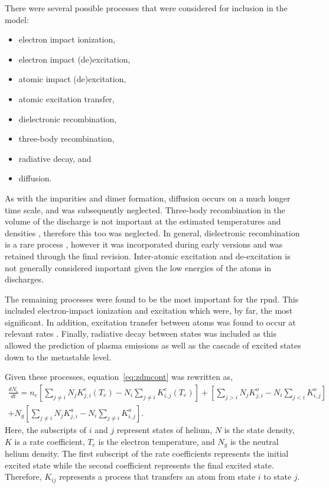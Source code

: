 There were several possible processes that were considered for inclusion in the
model:
\begin{itemize}
  \singlespacing
  \item electron impact ionization,
  \item electron impact (de)excitation,
  \item atomic impact (de)excitation,
  \item atomic excitation transfer,
  \item dielectronic recombination,
  \item three-body recombination,
  \item radiative decay, and
  \item diffusion.
\end{itemize}
As with the impurities and dimer formation, diffusion occurs on a much longer
time scale, and was subsequently neglected. Three-body recombination in the
volume of the discharge is not important at the estimated temperatures and
densities \cite{Lieberman2005}, therefore this too was neglected. In general,
dielectronic recombination is a rare process \cite{Nahar2010}, however it was
incorporated during early versions and was retained through the final revision.
Inter-atomic excitation and de-excitation is not generally considered important
given the low energies of the atoms in discharges.

The remaining processes were found to be the most important for the \acs{rpnd}.
This included electron-impact ionization and excitation which were, by far, the
most significant. In addition, excitation transfer between atoms was found to
occur at relevant rates \cite{Lieberman2005}. Finally, radiative decay between
states was included as this allowed the prediction of plasma emissions as well
as the cascade of excited states down to the metastable level.

Given these processes, equation~\ref{eq:zdmcont} was rewritten as,
\begin{multline}
  \frac{dN_i}{dt} =   n_e \left[       \sum_{j\neq i} N_j K^e_{j,i}(T_e) 
                                 - N_i \sum_{j\neq i}     K^e_{i,j}(T_e) \right]
                        + \left[       \sum_{j > i}   N_j K^o_{j,i} 
                                 - N_i \sum_{j < i}       K^o_{i,j}      \right] \\
                    + N_g \left[       \sum_{j\neq i} N_j K^a_{j,i} 
                                 - N_i \sum_{j\neq i}     K^a_{i,j}      \right].
  \label{eq:gcont}
\end{multline}
Here, the subscripts of $i$ and $j$ represent states of helium, $N$ is the state
density, $K$ is a rate coefficient, $T_e$ is the electron temperature, and $N_g$
is the neutral helium density. The first subscript of the rate coefficients
represents the initial excited state while the second coefficient represents the
final excited state. Therefore, $K_{ij}$ represents a process that transfers an 
atom from state $i$ to state $j$.

